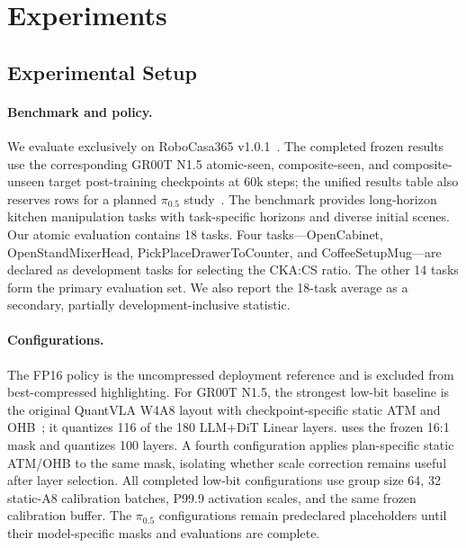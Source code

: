 \section{Experiments}
\label{sec:experiments}

\subsection{Experimental Setup}
\label{sec:setup}

\paragraph{Benchmark and policy.}
We evaluate exclusively on RoboCasa365 v1.0.1~\cite{nasiriany2026robocasa365}. The completed frozen results use the corresponding GR00T N1.5 atomic-seen, composite-seen, and composite-unseen target post-training checkpoints at 60k steps; the unified results table also reserves rows for a planned $\pi_{0.5}$ study~\cite{intelligence2025pi05}. The benchmark provides long-horizon kitchen manipulation tasks with task-specific horizons and diverse initial scenes. Our atomic evaluation contains 18 tasks. Four tasks---OpenCabinet, OpenStandMixerHead, PickPlaceDrawerToCounter, and CoffeeSetupMug---are declared as development tasks for selecting the CKA:CS ratio. The other 14 tasks form the primary evaluation set. We also report the 18-task average as a secondary, partially development-inclusive statistic.

\paragraph{Configurations.}
The FP16 policy is the uncompressed deployment reference and is excluded from best-compressed highlighting. For GR00T N1.5, the strongest low-bit baseline is the original QuantVLA W4A8 layout with checkpoint-specific static ATM and OHB~\cite{zhang2026quantvla}; it quantizes 116 of the 180 LLM+DiT Linear layers. \method uses the frozen 16:1 mask and quantizes 100 layers. A fourth configuration applies plan-specific static ATM/OHB to the same \method mask, isolating whether scale correction remains useful after layer selection. All completed low-bit configurations use group size 64, 32 static-A8 calibration batches, P99.9 activation scales, and the same frozen calibration buffer. The $\pi_{0.5}$ configurations remain predeclared placeholders until their model-specific masks and evaluations are complete.

